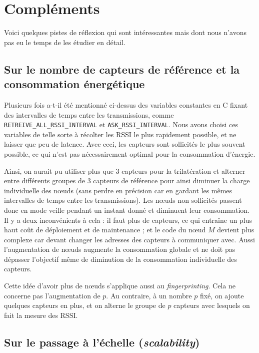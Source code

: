 \documentclass[french, a4paper, 12pt, parskip]{scrartcl}
\begin{document}
\section{Compléments}

Voici quelques pistes de réflexion qui sont intéressantes mais dont nous
n'avons pas eu le temps de les étudier en détail.

\subsection{Sur le nombre de capteurs de référence et la consommation énergétique}

Plusieurs fois a-t-il été mentionné ci-dessus des variables constantes en C
fixant des intervalles de temps entre les transmissions, comme
\verb+RETREIVE_ALL_RSSI_INTERVAL+ et \verb+ASK_RSSI_INTERVAL+. Nous avons
choisi ces variables de telle sorte à récolter les RSSI le plus rapidement
possible, et ne laisser que peu de latence. Avec ceci, les capteurs sont
sollicités le plus souvent possible, ce qui n'est pas nécessairement optimal
pour la consommation d'énergie.

Ainsi, on aurait pu utiliser plus que 3 capteurs pour la trilatération et
alterner entre différents groupes de 3 capteurs de référence pour ainsi
diminuer la charge individuelle des nœuds (sans perdre en précision car en
gardant les mêmes intervalles de temps entre les transmissions). Les nœuds non
sollicités passent donc en mode veille pendant un instant donné et diminuent
leur consommation. Il y a deux inconvénients à cela : il faut plus de capteurs,
ce qui entraîne un plus haut coût de déploiement et de maintenance ; et le code
du nœud $M$ devient plus complexe car devant changer les adresses des capteurs
à communiquer avec. Aussi l'augmentation de nœuds augmente la consommation
globale et ne doit pas dépasser l'objectif même de diminution de la
consommation individuelle des capteurs.

Cette idée d'avoir plus de nœuds s'applique aussi au \textit{fingerprinting}.
Cela ne concerne pas l'augmentation de $p$. Au contraire, à un nombre $p$ fixé,
on ajoute quelques capteurs en plus, et on alterne le groupe de $p$ capteurs
avec lesquels on fait la mesure des RSSI.

\subsection{Sur le passage à l'échelle (\textit{scalability})}
\end{document}
